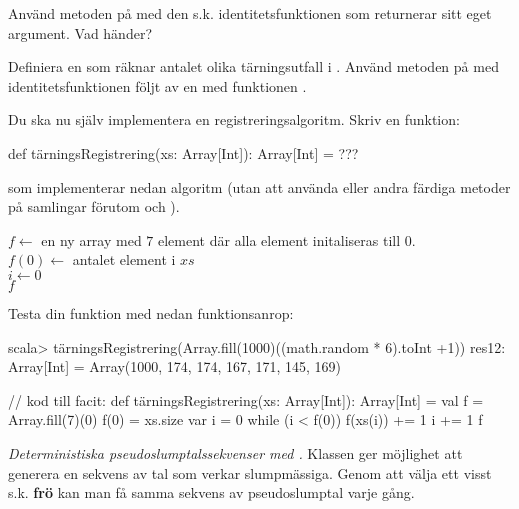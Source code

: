 \Subtask Använd metoden  på  med den s.k. identitetsfunktionen  som returnerar sitt eget argument. Vad händer? 

\Subtask Definiera en  som räknar antalet olika tärningsutfall i . Använd metoden  på  med identitetsfunktionen följt av en  med funktionen .

\Subtask Du ska nu själv implementera en registreringsalgoritm. Skriv en funktion:
\begin{Code}
def tärningsRegistrering(xs: Array[Int]): Array[Int] = ???
\end{Code}
som implementerar nedan algoritm (utan att använda  eller andra färdiga metoder på samlingar förutom  och ).


\begin{algorithm}[H]
 
 $f \leftarrow$ en ny array med $7$ element där alla element initaliseras till 0.\\
 $f(0) \leftarrow$ antalet element i $xs$ \\
 $i \leftarrow 0$  \\
 \Return $f$ 
\end{algorithm}

Testa din funktion med nedan funktionsanrop:
\begin{REPL}
scala> tärningsRegistrering(Array.fill(1000)((math.random * 6).toInt +1))
res12: Array[Int] = Array(1000, 174, 174, 167, 171, 145, 169)
\end{REPL}

\begin{Code}
// kod till facit:
def tärningsRegistrering(xs: Array[Int]): Array[Int] = {
  val f = Array.fill(7)(0)
  f(0) = xs.size
  var i = 0
  while (i < f(0)) {
    f(xs(i)) += 1
    i += 1
  }
  f 
}
\end{Code}


\Task \emph{Deterministiska pseudoslumptalssekvenser med .} Klassen  ger möjlighet att generera en sekvens av tal som verkar slumpmässiga. Genom att välja ett visst s.k. \textbf{frö}  kan man få samma sekvens av pseudoslumptal varje gång.

